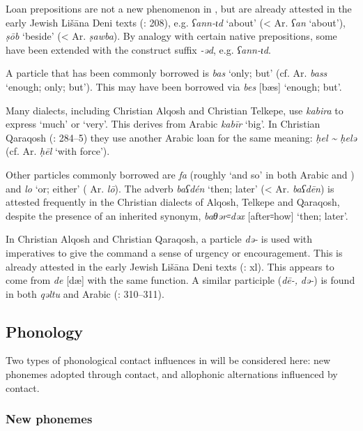 \documentclass[output=paper]{langsci/langscibook}
\begin{document}
Loan {prepositions} are not a new phenomenon in , but are already attested in the early Jewish Lišāna Deni texts (\citealt{Sabar1984}: 208), e.g. \textit{ʕann\nobreakdash-ɩd} ‘about’ (< Ar. \textit{ʕan} ‘about’), \textit{ṣōb} ‘beside’ (< Ar. \textit{ṣawba}). By {analogy} with certain native {prepositions}, some have been extended with the construct suffix \textit{\nobreakdash-əd}, e.g. \textit{ʕann\nobreakdash-ɩd}.

A p{article} that has been commonly borrowed is \textit{bas} ‘only; but’ (cf.  Ar. \textit{bass} ‘enough; only; but’). This may have been borrowed via  \textit{bes} [bæs] ‘enough; but’.

Many dialects, including Christian Alqosh and Christian Telkepe, use \textit{kabira} to express ‘much’ or ‘very’. This derives from Arabic \textit{kabīr} ‘big’. In Christian Qaraqosh (\citealt{Khan2002}: 284–5) they use another Arabic loan for the same meaning: \textit{ḥel {\textasciitilde} ḥelə} (cf.  Ar. \textit{ḥēl} ‘with force’).

Other particles commonly borrowed are \textit{fa} (roughly ‘and so’ in both Arabic and ) and \textit{lo} ‘or; either’ ( Ar. \textit{lō}). The adverb \textit{baʕdén} ‘then; later’ (< Ar. \textit{baʕdēn}) is attested frequently in the Christian dialects of Alqosh, Telkepe and Qaraqosh, despite the presence of an inherited synonym, \textit{baθər꞊dəx} [after꞊how] ‘then; later’.

In Christian Alqosh and Christian Qaraqosh, a particle \textit{də\nobreakdash-} is used with imperatives to give the command a sense of urgency or encouragement. This is already attested in the early Jewish Lišāna Deni texts (\citealt{Sabar1976}: xl). This appears to come from  \textit{de} [dæ] with the same function. A similar {participle} (\textit{dē\nobreakdash-,} \textit{də\nobreakdash-}) is found in both \textit{qəltu} and  Arabic (\citealt{Jastrow1978}: 310–311).

\subsection{Phonology}

Two types of phonological contact influences in  will be considered here: new phonemes adopted through contact, and allophonic alternations influenced by contact.

\subsubsection{New phonemes}
\end{document}
